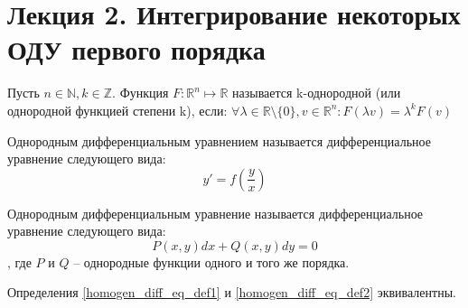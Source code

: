 \documentclass[document.tex]{subfiles}
\begin{document}
\section*{Лекция 2. Интегрирование некоторых ОДУ первого порядка}
\begin{Definition}
Пусть $n \in \mathbb{N}, k \in \mathbb{Z}$. Функция $F : \mathbb{R}^n \mapsto \mathbb{R}$ называется k-однородной (или однородной функцией степени k), если: $\forall \lambda \in \mathbb{R} \setminus \{0\}, v \in \mathbb{R}^n: F(\lambda v) = \lambda^k F(v)$
\end{Definition}
\begin{Definition}
\label{homogen_diff_eq_def1}
Однородным дифференциальным уравнением называется дифференциальное уравнение следующего вида:
$$y' = f(\frac{y}{x})$$
\end{Definition}
\begin{Definition}
\label{homogen_diff_eq_def2}
Однородным дифференциальным уравнение называется дифференциальное уравнение следующего вида:
$$P(x, y)dx + Q(x, y)dy = 0$$,
где $P$ и $Q$ -- однородные функции одного и того же порядка.
\end{Definition}
\begin{Statement}
Определения \ref{homogen_diff_eq_def1} и \ref{homogen_diff_eq_def2} эквивалентны.
\end{Statement}
\end{document}
